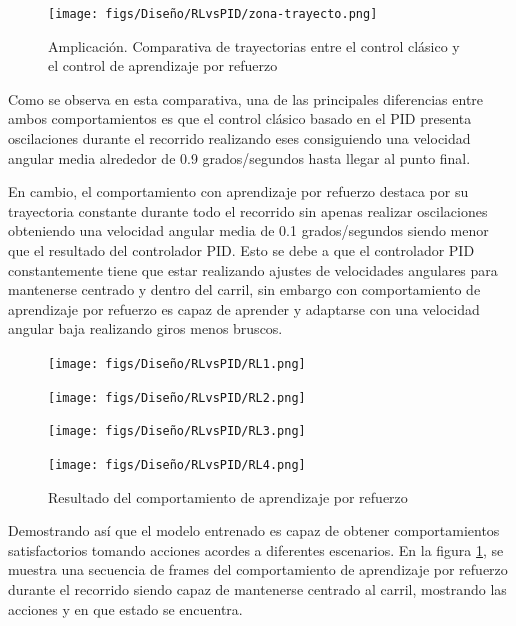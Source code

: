 \begin{figure}[H]
  \centering
  \begin{minipage}{0.65\textwidth}
    \texttt{[image: figs/Diseño/RLvsPID/zona-trayecto.png]}
  \end{minipage}
  \caption{Amplicación. Comparativa de trayectorias entre el control clásico y el control de aprendizaje por refuerzo}
  \vspace{-1.5em}
\end{figure}

Como se observa en esta comparativa, una de las principales diferencias entre ambos comportamientos es que el control clásico basado en el PID presenta oscilaciones durante el recorrido 
realizando eses consiguiendo una velocidad angular media alrededor de 0.9 grados/segundos hasta llegar al punto final.  

En cambio, el comportamiento con aprendizaje por refuerzo destaca por su trayectoria constante durante todo el recorrido sin apenas realizar oscilaciones obteniendo una velocidad angular 
media de 0.1 grados/segundos siendo menor que el resultado del controlador PID. Esto se debe a que el controlador PID constantemente tiene que estar realizando ajustes de velocidades 
angulares para mantenerse centrado y dentro del carril, sin embargo con comportamiento de aprendizaje por refuerzo es capaz de aprender y adaptarse con una velocidad angular baja 
realizando giros menos bruscos. 

\begin{figure}[H]
  \centering
  \begin{minipage}{0.3\textwidth}
    \texttt{[image: figs/Diseño/RLvsPID/RL1.png]}
  \end{minipage}
  \hfill
  \begin{minipage}{0.3\textwidth}
    \texttt{[image: figs/Diseño/RLvsPID/RL2.png]}
  \end{minipage}
  \hfill
  \begin{minipage}{0.3\textwidth}
    \texttt{[image: figs/Diseño/RLvsPID/RL3.png]}
  \end{minipage}
  \hfill
  \begin{minipage}{0.3\textwidth}
    \texttt{[image: figs/Diseño/RLvsPID/RL4.png]}
  \end{minipage}
  \caption{Resultado del comportamiento de aprendizaje por refuerzo}
  \label{fig:Resultado-imagenes}
  \vspace{-1.5em}
\end{figure}

Demostrando así que el modelo entrenado es capaz de obtener comportamientos satisfactorios tomando acciones acordes a diferentes escenarios. En la figura \ref{fig:Resultado-imagenes}, 
se muestra una secuencia de frames
del comportamiento de aprendizaje por refuerzo durante el recorrido siendo capaz de mantenerse centrado al carril, mostrando las acciones y en que estado se encuentra.

